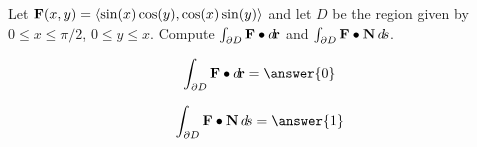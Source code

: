 \documentclass{ximera}
\author{David Guichard \and Neal Koblitz \and H. Jerome Keisler \and Albert Scheller \and Barry Balof \and Mike Wills \and Matthew Carr}
\begin{document}
\begin{exercise}




Let $\mathbf{F}(x,y)=\left\langle \sin(x)\cos(y),\cos(x)\sin(y)\right\rangle$ and let $D$ be the region given by $0\le x\le \pi/2$, $0\le y\le x$. Compute $\int_{\partial D}\mathbf{F}\bullet\mathop{}\!d\!\mathbf{r}$ and $\int_{\partial D}\mathbf{F}\bullet\mathbf{N}\mathop{}\!d\! s$.
 
\begin{prompt}
\[
\int_{\partial D}\vec{F}\dotp\d\vec{r}=\answer{0}
\]
\end{prompt}

\begin{prompt}
\[
\int_{\partial D}\vec{F}\dotp\vec{N}\d s=\answer{1}
\]
\end{prompt}



\end{exercise}
\end{document}
